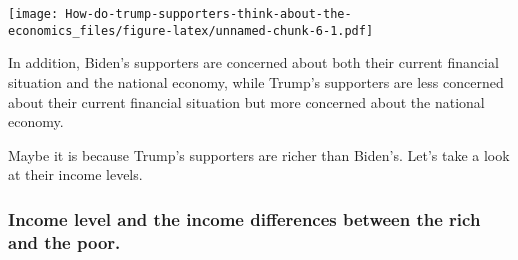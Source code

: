\documentclass[
]{article}
\begin{document}
\texttt{[image: How-do-trump-supporters-think-about-the-economics\_files/figure-latex/unnamed-chunk-6-1.pdf]}

In addition, Biden's supporters are concerned about both their current
financial situation and the national economy, while Trump's supporters
are less concerned about their current financial situation but more
concerned about the national economy.

Maybe it is because Trump's supporters are richer than Biden's. Let's
take a look at their income levels.

\hypertarget{income-level-and-the-income-differences-between-the-rich-and-the-poor.}{%
\subsubsection{Income level and the income differences between the rich
and the
poor.}\label{income-level-and-the-income-differences-between-the-rich-and-the-poor.}}
\end{document}
